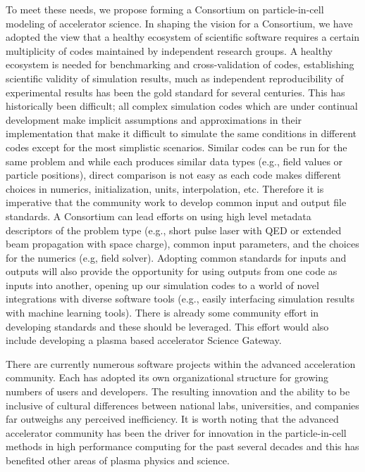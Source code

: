 \documentclass[aps,prstab,reprint,groupedaddress,nofootinbib]{revtex4-1}
\begin{document}
To meet these needs, we propose forming a Consortium on particle-in-cell modeling of accelerator science. In shaping the vision for a Consortium, we have adopted the view that a healthy ecosystem of scientific software requires a certain multiplicity of codes maintained by independent research groups. A healthy ecosystem is needed for benchmarking and cross-validation of codes, establishing scientific validity of simulation results, much as independent reproducibility of experimental results has been the gold standard for several centuries.  This has historically been difficult; all complex simulation codes which are under continual development make implicit assumptions and approximations in
their implementation that make it difficult to simulate the same conditions in different codes
except for the most simplistic scenarios.
Similar codes can be run for the same problem and while each produces similar data types (e.g., field values or particle positions), direct comparison is not easy as each code makes different choices in numerics, initialization, units, interpolation, etc. Therefore it is imperative that the community work to develop common input and output file standards. A Consortium can lead efforts on using high level metadata descriptors of the problem type (e.g., short pulse laser with QED or extended beam propagation with space charge), common input parameters, and the choices for the numerics (e.g, field solver). Adopting common standards for inputs and outputs will also provide the opportunity for using outputs from one code as inputs into another, opening up our simulation codes to a world of novel integrations with diverse software tools (e.g., easily interfacing simulation results with machine learning tools). There is already some community effort in developing standards\cite{OpenPMD,PICMI,VizSchema} and these should be leveraged.  This effort would also include developing a plasma based accelerator Science Gateway.

There are currently numerous software projects within the advanced acceleration community. Each has adopted its own organizational structure for growing numbers of users and developers.   The resulting innovation and the ability to be inclusive of cultural differences between national labs, universities, and companies far outweighs any perceived inefficiency. It  is worth noting that the advanced accelerator community has been the driver for innovation in the particle-in-cell methods in high performance computing for the past several decades and this has benefited other areas of plasma physics and science. 
\end{document}
